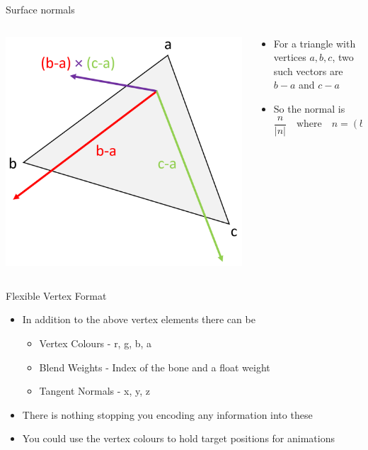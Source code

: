 \begin{frame}{Surface normals}
\begin{columns}
\begin{column}{0.33\textwidth}
		\includegraphics[width=\textwidth]{triangle_normal}
	\end{column}
	\begin{column}{0.65\textwidth}
		\begin{itemize}
			\item For a triangle with vertices $a, b, c$, two such vectors are $b-a$ and $c-a$
			\pause\item So the normal is
			$$ \frac{n}{|n|} \quad \text{where} \quad n = (b-a) \times (c-a) $$
		\end{itemize}
	\end{column}
\end{columns}
\end{frame}

\begin{frame}{Flexible Vertex Format}
	\begin{itemize}
		\item In addition to the above vertex elements there can be
		\begin{itemize}
			\pause \item Vertex Colours - r, g, b, a
			\pause \item Blend Weights - Index of the bone and a float weight
			\pause \item Tangent Normals - x, y, z
		\end{itemize}
		\pause \item There is nothing stopping you encoding any information into these
		\pause \item You could use the vertex colours to hold target positions for animations
	\end{itemize}
\end{frame}

